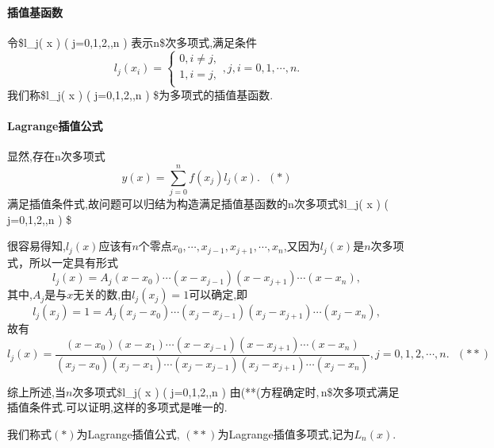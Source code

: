 \documentclass[11pt]{article}
\begin{document}
\hypertarget{ux63d2ux503cux57faux51fdux6570}{%
\paragraph{插值基函数}\label{ux63d2ux503cux57faux51fdux6570}}

令\$l\_j\left( x \right) \left( j=0,1,2,\cdots ,n \right)
\(表示\)n\$次多项式,满足条件 \[
l_j\left( x_i \right) =\begin{cases}
    0, i\ne j,\\
    1, i=j,\\
\end{cases},  j,i=0,1,\cdots ,n.
\] 我们称\$l\_j\left( x \right) \left( j=0,1,2,\cdots ,n \right)
\$为多项式的插值基函数.

\hypertarget{lagrangeux63d2ux503cux516cux5f0f}{%
\paragraph{Lagrange插值公式}\label{lagrangeux63d2ux503cux516cux5f0f}}

显然,存在n次多项式 \[
y\left( x \right) =\sum_{j=0}^n{f\left( x_j \right) l_j\left( x \right)}. \ \ \ \left(*\right)
\]
满足插值条件式,故问题可以归结为构造满足插值基函数的n次多项式\$l\_j\left(
x \right) \left( j=0,1,2,\cdots ,n \right) \$

很容易得知,\(l_j(x)\)应该有\(n\)个零点\(x_0,\cdots ,x_{j-1},x_{j+1},\cdots ,x_n\),又因为\(l_j(x)\)是\(n\)次多项式，所以一定具有形式
\[
l_j\left( x \right) =A_j\left( x-x_0 \right) \cdots \left( x-x_{j-1} \right) \left( x-x_{j+1} \right) \cdots \left( x-x_n \right) ,
\]
其中,\(A_j\)是与\(x\)无关的数,由\(l_j\left( x_j \right) =1\)可以确定,即
\[
l_j\left( x_j \right) = 1 =A_j\left( x_j-x_0 \right) \cdots \left( x_j-x_{j-1} \right) \left( x_j-x_{j+1} \right) \cdots \left( x_j-x_n \right) ,
\] 故有 \[
l_j\left( x \right) =\frac{\left( x-x_0 \right) \left( x-x_1 \right) \cdots \left( x-x_{j-1} \right) \left( x-x_{j+1} \right) \cdots \left( x-x_n \right)}{\left( x_j-x_0 \right) \left( x_j-x_1 \right) \cdots \left( x_j-x_{j-1} \right) \left( x_j-x_{j+1} \right) \cdots \left( x_j-x_n \right)}, j=0,1,2,\cdots ,n. \ \ \ \left(**\right)
\]

综上所述,当\(n\)次多项式\$l\_j\left( x \right) \left( j=0,1,2,\cdots ,n
\right)
\(由\)\left(**\right(\(方程确定时,\)n\$次多项式满足插值条件式.可以证明,这样的多项式是唯一的.

我们称式\(\left(*\right)\)为Lagrange插值公式,
\(\left(**\right)\)为Lagrange插值多项式,记为\(L_n(x)\).
\end{document}
